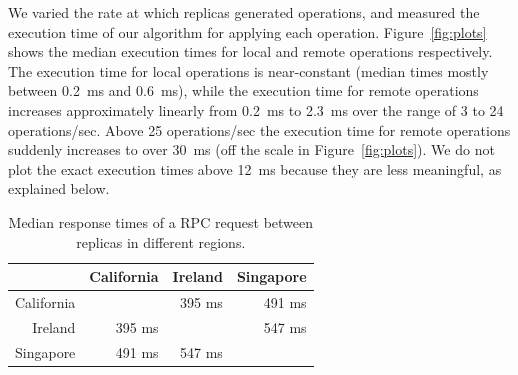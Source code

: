 \documentclass[sigplan,anonymous]{acmart}
\begin{document}
We varied the rate at which replicas generated operations, and measured the execution time of our algorithm for applying each operation.
Figure~\ref{fig:plots} shows the median execution times for local and remote operations respectively.
The execution time for local operations is near-constant (median times mostly between 0.2~ms and 0.6~ms), while the execution time for remote operations increases approximately linearly from 0.2~ms to 2.3~ms over the range of 3 to 24 operations/sec.
Above 25 operations/sec the execution time for remote operations suddenly increases to over 30~ms (off the scale in Figure~\ref{fig:plots}).
We do not plot the exact execution times above 12~ms because they are less meaningful, as explained below.

\begin{table}
  \caption{Median response times of a RPC request between replicas in different regions.}
  \label{tab:rpc-times}
  \begin{tabular}{r|rrr}
    \toprule
               & California & Ireland & Singapore \\
    \midrule
    California &            & 395 ms  & 491 ms    \\
    Ireland    & 395 ms     &         & 547 ms    \\
    Singapore  & 491 ms     & 547 ms  &           \\
    \bottomrule
\end{tabular}
\end{table}
\end{document}
